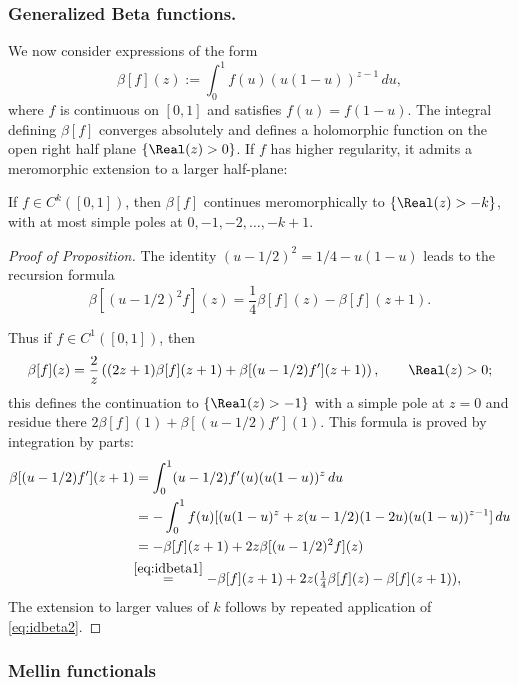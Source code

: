 \subsubsection*{Generalized Beta functions.}
We now consider expressions of the form
\begin{equation*}
\beta[f](z) := \int_0^1 f(u) (u(1-u))^{z-1}\,du,
\end{equation*}
where $f$ is continuous on $[0,1]$ and satisfies $f(u) = f(1-u)$. The integral defining $\beta[f]$ converges absolutely and defines a holomorphic function
on the open right half plane $\{\Real(z)>0\}$. If $f$ has higher regularity, it admits a meromorphic extension to a larger half-plane:
\begin{Proposition}\label{prop:merocont}
If $f\in C^k([0,1])$, then $\beta[f]$ continues meromorphically to $\{\Real(z)>-k\}$, with at most simple poles at $0, -1, -2, \dots, -k+1$.
\end{Proposition}
\begin{proof}[Proof of Proposition]
The identity $(u-1/2)^2 = 1/4 - u(1-u)$ leads to the recursion formula
\begin{equation}
\beta[(u-1/2)^2 f](z) = \frac{1}{4} \beta[f](z) - \beta[f] (z+1).
\label{eq:idbeta1}
\end{equation}

Thus if $f\in C^1([0,1])$, then
\begin{equation}
\beta[f](z) = \frac{2}{z} \left((2z+1) \beta[f] (z+1) + \beta[(u-1/2)f'] (z+1) \right), \qquad \Real(z)>0;
\label{eq:idbeta2}
\end{equation}
this defines the continuation to $\{\Real(z)>-1\}$ with a simple pole at $z=0$ and residue there
$2\beta[f](1) + \beta[(u-1/2)f'](1)$. This formula is proved by integration by parts:
\begin{align*}
\beta[(u-1/2)f'](z+1) &= \int_0^1 (u-1/2)f'(u) (u(1-u))^z\,du \\
&= - \int_0^1 f(u) [(u(1-u)^z + z (u-1/2)(1-2u) (u(1-u))^{z-1}]\,du \\
&= - \beta[f] (z+1) + 2z \beta[(u-1/2)^2 f](z) \\
&\!\!\stackrel{\eqref{eq:idbeta1}}{=} - \beta[f] (z+1) + 2z (\tfrac{1}{4} \beta[f](z) - \beta[f] (z+1)),
\end{align*}
The extension to larger values of $k$ follows by repeated application of \eqref{eq:idbeta2}.
\end{proof}

\subsubsection{Mellin functionals} \label{sec:Mellin}

